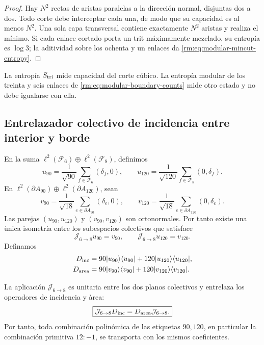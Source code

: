 \begin{proof}
Hay \(N^2\) rectas de aristas paralelas a la direcci\'on normal, disjuntas
dos a dos. Todo corte debe interceptar cada una, de modo que su capacidad
es al menos \(N^2\). Una sola capa transversal contiene exactamente
\(N^2\) aristas y realiza el m\'inimo. Si cada enlace cortado porta un trit
m\'aximamente mezclado, su entrop\'ia es \(\log3\); la aditividad sobre los
ochenta y un enlaces da \cref{rm:eq:modular-mincut-entropy}.
\end{proof}

La entrop\'ia \(S_{\rm tri}\) mide capacidad del corte c\'ubico. La
entrop\'ia modular de los treinta y seis enlaces de
\cref{rm:eq:modular-boundary-counts} mide otro estado y no debe igualarse con
ella.

\subsection{Entrelazador colectivo de incidencia entre interior y borde}

En la suma
\(\ell^2(\mathcal F_6)\oplus\ell^2(\mathcal F_8)\), definimos
\begin{equation}
\label{rm:eq:modular-u90-u120}
u_{90}=\frac1{\sqrt{90}}\sum_{f\in\mathcal F_6}(\delta_f,0),
\qquad
u_{120}=\frac1{\sqrt{120}}\sum_{f\in\mathcal F_8}(0,\delta_f).
\end{equation}
En
\(\ell^2(\partial A_{90})\oplus\ell^2(\partial A_{120})\), sean
\begin{equation}
\label{rm:eq:modular-v90-v120}
v_{90}=\frac1{\sqrt{18}}\sum_{e\in\partial A_{90}}(\delta_e,0),
\qquad
v_{120}=\frac1{\sqrt{18}}\sum_{e\in\partial A_{120}}(0,\delta_e).
\end{equation}
Las parejas \((u_{90},u_{120})\) y \((v_{90},v_{120})\) son ortonormales.
Por tanto existe una \`unica isometr\'ia entre los subespacios colectivos
que satisface
\begin{equation}
\label{rm:eq:modular-J68}
\mathcal J_{6\to8}u_{90}=v_{90},
\qquad
\mathcal J_{6\to8}u_{120}=v_{120}.
\end{equation}
Definamos
\begin{align}
D_{\rm inc}
&=90|u_{90}\rangle\langle u_{90}|
+120|u_{120}\rangle\langle u_{120}|,
\label{rm:eq:modular-Dinc}\\
D_{\rm area}
&=90|v_{90}\rangle\langle v_{90}|
+120|v_{120}\rangle\langle v_{120}|.
\label{rm:eq:modular-Darea}
\end{align}

\begin{theorem}
\label{rm:thm:modular-J68}
La aplicaci\'on \(\mathcal J_{6\to8}\) es unitaria entre los dos planos
colectivos y entrelaza los operadores de incidencia y \`area:
\begin{equation}
\label{rm:eq:modular-J-intertwining}
\boxed{
\mathcal J_{6\to8}D_{\rm inc}
=D_{\rm area}\mathcal J_{6\to8}.}
\end{equation}
Por tanto, toda combinaci\'on polin\'omica de las etiquetas \(90,120\), en
particular la combinaci\'on primitiva \(12:-1\), se transporta con los
mismos coeficientes.
\end{theorem}

